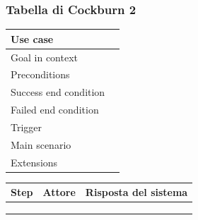 \documentclass[italian,11pt,a4paper]{article}
\begin{document}
\subsubsection{Tabella di Cockburn 2}
\begin{table}[H]\centering
\begin{tabularx}{\textwidth}{|p{4cm}|X|}\hline
\textbf{Use case} & \\\hline
Goal in context & \\\hline
Preconditions & \\\hline
Success end condition & \\\hline
Failed end condition & \\\hline
Trigger & \\\hline
Main scenario & \\\hline
Extensions & \\\hline
\end{tabularx}
\end{table}
\begin{table}[H]\centering
\begin{tabularx}{\textwidth}{|p{1.5cm}|X|X|}\hline
\textbf{Step} & \textbf{Attore} & \textbf{Risposta del sistema}\\\hline
 & & \\\hline
 & & \\\hline
 & & \\\hline
\end{tabularx}
\end{table}
\end{document}
